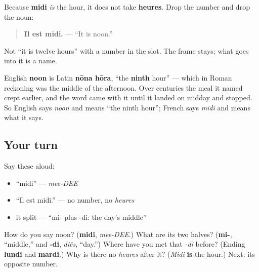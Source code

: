 \begin{grammarlens}[title={Grammar Lens: a name instead of a number}]
Because \textbf{midi} \emph{is} the hour, it does not take \textbf{heures}. Drop the number and drop the noun:

\begin{quote}
\textbf{Il est midi.} — \textquotedblleft{}It is noon.\textquotedblright{}
\end{quote}

Not \textquotedblleft{}it is twelve hours\textquotedblright{} with a number in the slot. The frame stays; what goes into it is a name.
\end{grammarlens}

\begin{culture}
English \textbf{noon} is Latin \textbf{nōna hōra}, \textquotedblleft{}the \textbf{ninth} hour\textquotedblright{} — which in Roman reckoning was the middle of the afternoon. Over centuries the meal it named crept earlier, and the word came with it until it landed on midday and stopped. So English says \emph{noon} and means \textquotedblleft{}the ninth hour\textquotedblright{}; French says \emph{midi} and means what it says.
\end{culture}

\subsection*{Your turn}
Say these aloud:

\begin{itemize}
\raggedright
  \item \textquotedblleft{}midi\textquotedblright{} — \emph{mee-DEE}
  \item \textquotedblleft{}Il est midi.\textquotedblright{} — no number, no \emph{heures}
  \item it split — \textquotedblleft{}mi- plus -di: the day's middle\textquotedblright{}
\end{itemize}

\begin{tcolorbox}[breakable,colback=teal!4,colframe=teal!35!black,title={Before you move on}]
How do you say noon? (\textbf{midi}, \emph{mee-DEE}.) What are its two halves? (\textbf{mi-}, \textquotedblleft{}middle,\textquotedblright{} and \textbf{-di}, \emph{diēs}, \textquotedblleft{}day.\textquotedblright{}) Where have you met that \emph{-di} before? (Ending \textbf{lundi} and \textbf{mardi}.) Why is there no \emph{heures} after it? (\emph{Midi} \textbf{is} the hour.) Next: its opposite number.
\end{tcolorbox}
